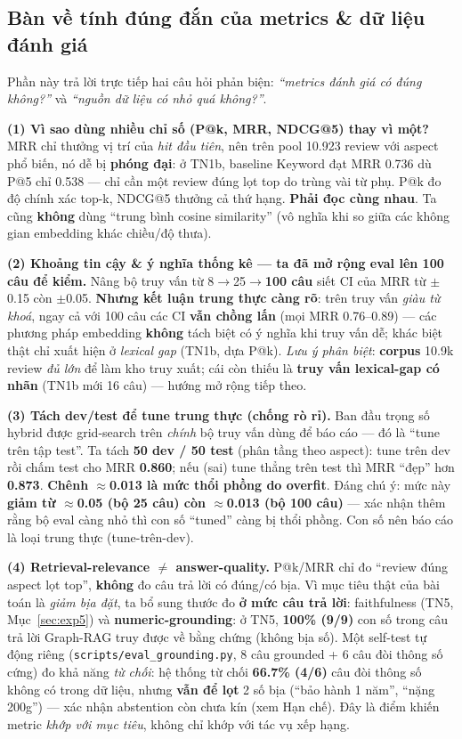 \documentclass[12pt,a4paper]{article}
\begin{document}
\subsection{Bàn về tính đúng đắn của metrics \& dữ liệu đánh giá}
\label{sec:metric-crit}

Phần này trả lời trực tiếp hai câu hỏi phản biện: \textit{``metrics đánh giá có đúng không?''} và \textit{``nguồn dữ liệu có nhỏ quá không?''}.

\textbf{(1) Vì sao dùng nhiều chỉ số (P@k, MRR, NDCG@5) thay vì một?} MRR chỉ thưởng vị trí của \textit{hit đầu tiên}, nên trên pool 10.923 review với aspect phổ biến, nó dễ bị \textbf{phóng đại}: ở TN1b, baseline Keyword đạt MRR 0.736 dù P@5 chỉ 0.538 --- chỉ cần một review đúng lọt top do trùng vài từ phụ. P@k đo độ chính xác top-k, NDCG@5 thưởng cả thứ hạng. \textbf{Phải đọc cùng nhau}. Ta cũng \textbf{không} dùng ``trung bình cosine similarity'' (vô nghĩa khi so giữa các không gian embedding khác chiều/độ thưa).

\textbf{(2) Khoảng tin cậy \& ý nghĩa thống kê --- ta đã mở rộng eval lên 100 câu để kiểm.} Nâng bộ truy vấn từ 8$\to$25$\to$\textbf{100 câu} siết CI của MRR từ $\pm$0.15 còn $\pm$0.05. \textbf{Nhưng kết luận trung thực càng rõ}: trên truy vấn \textit{giàu từ khoá}, ngay cả với 100 câu các CI \textbf{vẫn chồng lấn} (mọi MRR 0.76--0.89) --- các phương pháp embedding \textbf{không} tách biệt có ý nghĩa khi truy vấn dễ; khác biệt thật chỉ xuất hiện ở \textit{lexical gap} (TN1b, dựa P@k). \textit{Lưu ý phân biệt}: \textbf{corpus} 10.9k review \textit{đủ lớn} để làm kho truy xuất; cái còn thiếu là \textbf{truy vấn lexical-gap có nhãn} (TN1b mới 16 câu) --- hướng mở rộng tiếp theo.

\textbf{(3) Tách dev/test để tune trung thực (chống rò rỉ).} Ban đầu trọng số hybrid được grid-search trên \textit{chính} bộ truy vấn dùng để báo cáo --- đó là ``tune trên tập test''. Ta tách \textbf{50 dev / 50 test} (phân tầng theo aspect): tune trên dev rồi chấm test cho MRR \textbf{0.860}; nếu (sai) tune thẳng trên test thì MRR ``đẹp'' hơn \textbf{0.873}. \textbf{Chênh $\approx$0.013 là mức thổi phồng do overfit}. Đáng chú ý: mức này \textbf{giảm từ $\approx$0.05 (bộ 25 câu) còn $\approx$0.013 (bộ 100 câu)} --- xác nhận thêm rằng bộ eval càng nhỏ thì con số ``tuned'' càng bị thổi phồng. Con số nên báo cáo là loại trung thực (tune-trên-dev).

\textbf{(4) Retrieval-relevance $\neq$ answer-quality.} P@k/MRR chỉ đo ``review đúng aspect lọt top'', \textbf{không} đo câu trả lời có đúng/có bịa. Vì mục tiêu thật của bài toán là \textit{giảm bịa đặt}, ta bổ sung thước đo \textbf{ở mức câu trả lời}: faithfulness (TN5, Mục~\ref{sec:exp5}) và \textbf{numeric-grounding}: ở TN5, \textbf{100\% (9/9)} con số trong câu trả lời Graph-RAG truy được về bằng chứng (không bịa số). Một self-test tự động riêng (\texttt{scripts/eval\_grounding.py}, 8 câu grounded + 6 câu đòi thông số cứng) đo khả năng \textit{từ chối}: hệ thống từ chối \textbf{66.7\% (4/6)} câu đòi thông số không có trong dữ liệu, nhưng \textbf{vẫn để lọt} 2 số bịa (``bảo hành 1 năm'', ``nặng 200g'') --- xác nhận abstention còn chưa kín (xem Hạn chế). Đây là điểm khiến metric \textit{khớp với mục tiêu}, không chỉ khớp với tác vụ xếp hạng.
\end{document}
